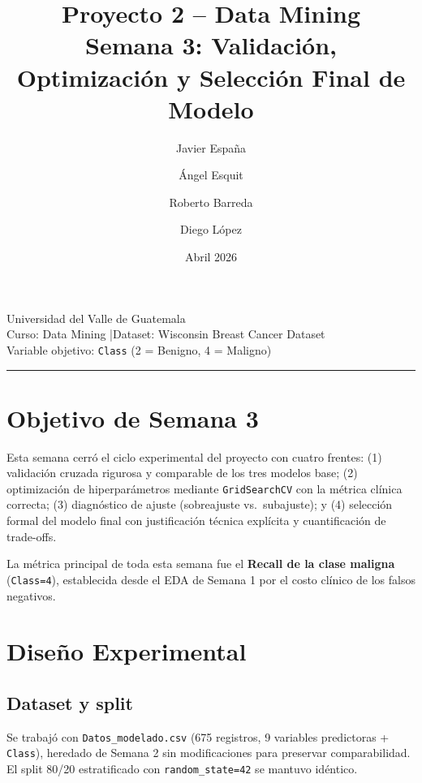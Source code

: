 \documentclass[11pt,a4paper]{article}
\title{\textbf{Proyecto 2 -- Data Mining}\\[0.4em]
       \large Semana 3: Validación, Optimización y Selección Final de Modelo}
\author{Javier España \and Ángel Esquit \and Roberto Barreda \and Diego López}
\date{Abril 2026}
\begin{document}
\maketitle
\thispagestyle{empty}

\begin{center}
\large Universidad del Valle de Guatemala\\[0.2em]
\normalsize Curso: Data Mining \quad|\quad Dataset: Wisconsin Breast Cancer Dataset\\[0.2em]
Variable objetivo: \texttt{Class} \;(2 = Benigno, 4 = Maligno)
\end{center}

\vspace{0.5em}\hrule\vspace{0.5em}

\tableofcontents
\newpage

\section{Objetivo de Semana 3}

Esta semana cerró el ciclo experimental del proyecto con cuatro frentes: (1) validación cruzada rigurosa y comparable de los tres modelos base; (2) optimización de hiperparámetros mediante \texttt{GridSearchCV} con la métrica clínica correcta; (3) diagnóstico de ajuste (sobreajuste vs.\ subajuste); y (4) selección formal del modelo final con justificación técnica explícita y cuantificación de trade-offs.

La métrica principal de toda esta semana fue el \textbf{Recall de la clase maligna} (\texttt{Class=4}), establecida desde el EDA de Semana 1 por el costo clínico de los falsos negativos.

\section{Diseño Experimental}

\subsection{Dataset y split}

Se trabajó con \texttt{Datos\_modelado.csv} (675 registros, 9 variables predictoras + \texttt{Class}), heredado de Semana 2 sin modificaciones para preservar comparabilidad. El split 80/20 estratificado con \texttt{random\_state=42} se mantuvo idéntico.
\end{document}
